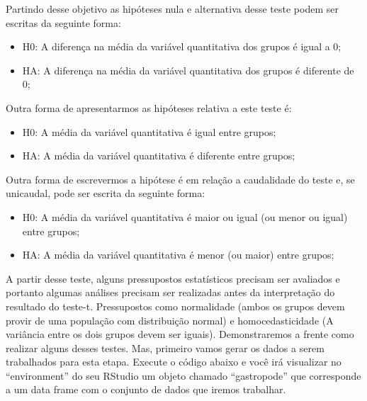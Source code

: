 \documentclass[titlepage, oneside, openany, a4paper]{book}
\begin{document}
Partindo desse objetivo as hipóteses nula e alternativa desse teste podem ser escritas da seguinte forma:

\begin{itemize}
\item
  H0: A diferença na média da variável quantitativa dos grupos é igual a 0;
\item
  HA: A diferença na média da variável quantitativa dos grupos é diferente de 0;
\end{itemize}

Outra forma de apresentarmos as hipóteses relativa a este teste é:

\begin{itemize}
\item
  H0: A média da variável quantitativa é igual entre grupos;
\item
  HA: A média da variável quantitativa é diferente entre grupos;
\end{itemize}

Outra forma de escrevermos a hipótese é em relação a caudalidade do teste e, se unicaudal, pode ser escrita da seguinte forma:

\begin{itemize}
\item
  H0: A média da variável quantitativa é maior ou igual (ou menor ou igual) entre grupos;
\item
  HA: A média da variável quantitativa é menor (ou maior) entre grupos;
\end{itemize}

A partir desse teste, alguns pressupostos estatísticos precisam ser avaliados e portanto algumas análises precisam ser realizadas antes da interpretação do resultado do teste-t. Pressupostos como normalidade (ambos os grupos devem provir de uma população com distribuição normal) e homocedasticidade (A variância entre os dois grupos devem ser iguais). Demonstraremos a frente como realizar alguns desses testes. Mas, primeiro vamos gerar os dados a serem trabalhados para esta etapa. Execute o código abaixo e você irá visualizar no ``environment'' do seu RStudio um objeto chamado ``gastropode'' que corresponde a um data frame com o conjunto de dados que iremos trabalhar.
\end{document}
